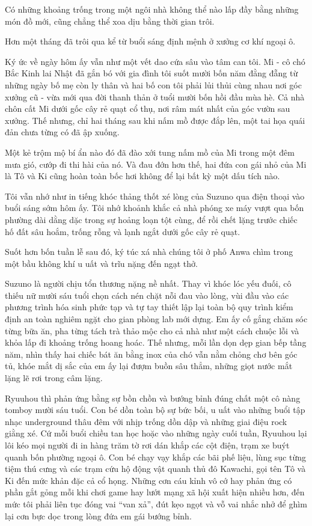 \documentclass[../main.tex]{subfiles}
\begin{document}

Có những khoảng trống trong một ngôi nhà không thể nào lấp đầy bằng những món đồ mới, cũng chẳng thể xoa dịu bằng thời gian trôi.

Hơn một tháng đã trôi qua kể từ buổi sáng định mệnh ở xưởng cơ khí ngoại ô.

Ký ức về ngày hôm ấy vẫn như một vết dao cứa sâu vào tâm can tôi. Mi - cô chó Bắc Kinh lai Nhật đã gắn bó với gia đình tôi suốt mười bốn năm đằng đẵng từ những ngày bố mẹ còn ly thân và hai bố con tôi phải lủi thủi cùng nhau nơi góc xưởng cũ - vừa mới qua đời thanh thản ở tuổi mười bốn hồi đầu mùa hè. Cả nhà chôn cất Mi dưới gốc cây rẻ quạt cổ thụ, nơi râm mát nhất của góc vườn sau xưởng. Thế nhưng, chỉ hai tháng sau khi nấm mồ được đắp lên, một tai họa quái đản chưa từng có đã ập xuống.

Một kẻ trộm mộ bí ẩn nào đó đã đào xới tung nấm mồ của Mi trong một đêm mưa gió, cướp đi thi hài của nó. Và đau đớn hơn thế, hai đứa con gái nhỏ của Mi là Tô và Ki cũng hoàn toàn bốc hơi không để lại bất kỳ một dấu tích nào.

Tôi vẫn nhớ như in tiếng khóc thảng thốt xé lòng của Suzuno qua điện thoại vào buổi sáng sớm hôm ấy. Tôi nhớ khoảnh khắc cả nhà phóng xe máy vượt qua bốn phường dài dằng dặc trong sự hoảng loạn tột cùng, để rồi chết lặng trước chiếc hố đất sâu hoắm, trống rỗng và lạnh ngắt dưới gốc cây rẻ quạt.

Suốt hơn bốn tuần lễ sau đó, ký túc xá nhà chúng tôi ở phố Anwa chìm trong một bầu không khí u uất và trĩu nặng đến ngạt thở.

Suzuno là người chịu tổn thương nặng nề nhất. Thay vì khóc lóc yếu đuối, cô thiếu nữ mười sáu tuổi chọn cách nén chặt nỗi đau vào lòng, vùi đầu vào các phương trình hóa sinh phức tạp và tự tay thiết lập lại toàn bộ quy trình kiểm định an toàn nghiêm ngặt cho gian phòng lab mới dựng. Em ấy cố gắng chăm sóc từng bữa ăn, pha từng tách trà thảo mộc cho cả nhà như một cách chuộc lỗi và khỏa lấp đi khoảng trống hoang hoác. Thế nhưng, mỗi lần dọn dẹp gian bếp tầng năm, nhìn thấy hai chiếc bát ăn bằng inox của chó vẫn nằm chỏng chơ bên góc tủ, khóe mắt dị sắc của em ấy lại đượm buồn sâu thẳm, những giọt nước mắt lặng lẽ rơi trong câm lặng.

Ryuuhou thì phản ứng bằng sự bồn chồn và bướng bỉnh đúng chất một cô nàng tomboy mười sáu tuổi. Con bé dồn toàn bộ sự bức bối, u uất vào những buổi tập nhạc underground thâu đêm với nhịp trống dồn dập và những giai điệu rock giằng xé. Cứ mỗi buổi chiều tan học hoặc vào những ngày cuối tuần, Ryuuhou lại lôi kéo mọi người đi in hàng trăm tờ rơi dán khắp các cột điện, trạm xe buýt quanh bốn phường ngoại ô. Con bé chạy vạy khắp các bãi phế liệu, lùng sục từng tiệm thú cưng và các trạm cứu hộ động vật quanh thủ đô Kawachi, gọi tên Tô và Ki đến mức khản đặc cả cổ họng. Những cơn cáu kỉnh vô cớ hay phản ứng có phần gắt gỏng mỗi khi chơi game hay lướt mạng xã hội xuất hiện nhiều hơn, đến mức tôi phải liên tục đóng vai ``van xả'', đút kẹo ngọt và vỗ vai nhắc nhở để ghìm lại cơn bực dọc trong lòng đứa em gái bướng bỉnh.
\end{document}
